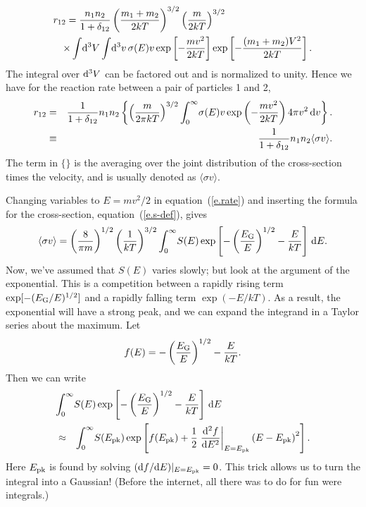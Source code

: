\begin{eqnarray*}
\lefteqn{r_{12} = \frac{n_{1}n_{2}}{1+\delta_{12}} \left(\frac{m_{1}+m_{2}}{2kT}\right)^{3/2}\left(\frac{m}{2kT}\right)^{3/2}}\\
&&\times \int\!\dif^{3}V \int\!\dif^{3}v \,\sigma(E)v \exp\left[-\frac{mv^{2}}{2kT}\right]
 \exp\left[-\frac{(m_{1}+m_{2})V^{2}}{2kT}\right].
\end{eqnarray*}
The integral over $\mathrm{d}^{3}V$ can be factored out and is normalized to unity. Hence we have for the reaction rate between a pair of particles 1 and 2, 
\begin{eqnarray}\label{e.rate}
r_{12} &=& \frac{1}{1+\delta_{12}}n_{1}n_{2}\left\{\left(\frac{m}{2\pi kT}\right)^{3/2}\int_{0}^{\infty}\! \sigma(E) v \exp\left(-\frac{mv^{2}}{2kT}\right)  4\pi v^{2}\,\mathrm{d} v\right\}.\nonumber\\
 &\equiv& \frac{1}{1+\delta_{12}}n_{1}n_{2}\langle\sigma v\rangle.
\end{eqnarray}
The term in $\{\}$ is the averaging over the joint distribution of the cross-section times the velocity, and is usually denoted as $\langle\sigma v\rangle$. 

Changing variables to $E = mv^{2}/2$ in equation~(\ref{e.rate}) and inserting the formula for the cross-section, equation~(\ref{e.s-def}), gives
\begin{equation}\label{e.integral}
\langle\sigma v\rangle = \left(\frac{8}{\pi m}\right)^{1/2}\left(\frac{1}{kT}\right)^{3/2}\int_{0}^{\infty}\!S(E)\exp\left[-\left(\frac{E_{\mathrm{G}}}{E}\right)^{1/2}-\frac{E}{kT}\right]\,\mathrm{d} E.
\end{equation}
Now, we've assumed that $S(E)$ varies slowly; but look at the argument of the exponential. This is a competition between a rapidly rising term $\exp[-(E_{\mathrm{G}}/E)^{1/2}]$ and a rapidly falling term $\exp(-E/kT)$. As a result, the exponential will have a strong peak, and we can expand the integrand in a Taylor series about the maximum. Let 
\[
f(E) = -\left(\frac{E_{\mathrm{G}}}{E}\right)^{1/2} - \frac{E}{kT}.
\]
Then we can write 
\begin{eqnarray*}
\lefteqn{\int_{0}^{\infty}\!S(E)\exp\left[-\left(\frac{\EG}{E}\right)^{1/2}-\frac{E}{kT}\right]\,\dif E}\\
&\approx&
	\int_{0}^{\infty}\! S(\Epk)\exp\left[f(\Epk) + \frac{1}{2}\left.\frac{\dif^{2} f}{\dif E^{2}}\right|_{E=\Epk}\left(E-\Epk\right)^{2}\right].
\end{eqnarray*}
Here $E_{\mathrm{pk}}$ is found by solving $(\mathrm{d} f/\mathrm{d} E)|_{E=E_{\mathrm{pk}}} = 0$. This trick allows us to turn the integral into a Gaussian! (Before the internet, all there was to do for fun were integrals.)

